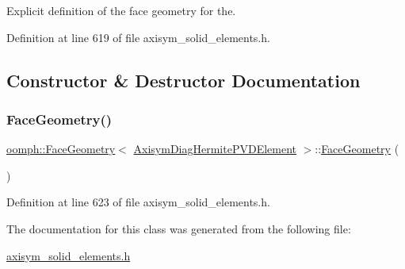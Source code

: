 Explicit definition of the face geometry for the. 

Definition at line 619 of file axisym\+\_\+solid\+\_\+elements.\+h.



\subsection{Constructor \& Destructor Documentation}
\mbox{\label{classoomph_1_1FaceGeometry_3_01AxisymDiagHermitePVDElement_01_4_aa0a1300dacd623e039294b2bdefaceef}} 
\subsubsection{\texorpdfstring{Face\+Geometry()}{FaceGeometry()}}
{\footnotesize\ttfamily \hyperlink{classoomph_1_1FaceGeometry}{oomph\+::\+Face\+Geometry}$<$ \hyperlink{classoomph_1_1AxisymDiagHermitePVDElement}{Axisym\+Diag\+Hermite\+P\+V\+D\+Element} $>$\+::\hyperlink{classoomph_1_1FaceGeometry}{Face\+Geometry} (\begin{DoxyParamCaption}{ }\end{DoxyParamCaption})\hspace{0.3cm}{\ttfamily [inline]}}



Definition at line 623 of file axisym\+\_\+solid\+\_\+elements.\+h.



The documentation for this class was generated from the following file\+:\begin{DoxyCompactItemize}
\item 
\hyperlink{axisym__solid__elements_8h}{axisym\+\_\+solid\+\_\+elements.\+h}\end{DoxyCompactItemize}
